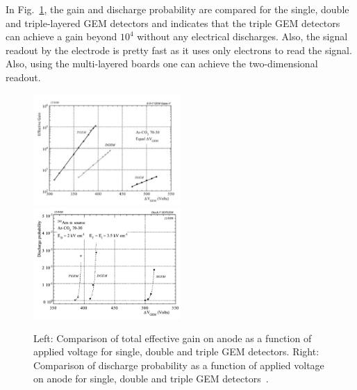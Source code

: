 In Fig.~\ref{fig:tripleGEM_discharge_gain}, the gain and discharge probability are compared for the single, double and triple-layered GEM detectors and indicates that the triple GEM detectors can achieve a gain beyond $10^4$ without any electrical discharges.
Also, the signal readout by the electrode is pretty fast as it uses only electrons to read the signal. 
Also, using the multi-layered boards one can achieve the two-dimensional readout.
\begin{figure}[!htbp]
    \centering
    \includegraphics[width=0.5\textwidth]{figures/GEM/Comp_threeGEMS_Gain.png}%
    \includegraphics[width=0.5\textwidth]{figures/GEM/Comp_threeGEMS_DischargeProbability.png}
    \caption{Left: Comparison of total effective gain on anode as a function of applied voltage for single, double and triple GEM detectors. Right: Comparison of discharge probability as a function of applied voltage on anode for single, double and triple GEM detectors~\cite{Bachmann2002}.}
    \label{fig:tripleGEM_discharge_gain}
\end{figure}

